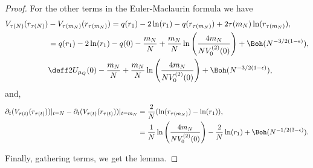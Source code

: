 \begin{proof}
For the other terms in the Euler-Maclaurin formula we have
\begin{align}
	V_{\tau(N)}(r_{\tau(N)})  &- V_{\tau{(m_N)}}(r_{\tau(m_N)}) = q(r_1) - 2 \ln(r_1) - q(r_{\tau(m_N)}) + 2 \tau(m_N) \ln(r_{\tau(m_N)}), \\
	& = q(r_1) - 2 \ln(r_1) - q(0) - \frac{m_N}{N} + \frac{m_N}{N} \ln{\left(\frac{4 m_N}{N V^{(2)}_0(0)}\right)} + \Boh(N^{-3/2(1-\epsilon)}), \\
	& \deff 2 U_{\mu_Q}(0) - \frac{m_N}{N} + \frac{m_N}{N} \ln{\left(\frac{4 m_N}{N V^{(2)}_0(0)}\right)} + \Boh(N^{-3/2(1-\epsilon)}),
\end{align}
and,
\begin{align}
		\partial_t (V_{\tau(t)}(r_{\tau(t)})) |_{t=N} - \partial_t (V_{\tau(t)}(r_{\tau(t)})) |_{t=m_N} & = \frac{2}{N}(\ln(r_{\tau(m_N)}) - \ln(r_1)), \\
		& = \frac{1}{N} \ln{\left(\frac{4 m_N}{N V^{(2)}_0(0)}\right)}  - \frac{2}{N} \ln(r_1) + \Boh(N^{-1/2(3-\epsilon)}).
\end{align}

Finally, gathering terms, we get the lemma.
\end{proof}

